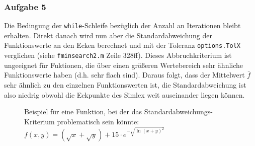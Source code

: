 \documentclass[a4paper, 12pt]{report}
\begin{document}
\subsubsection{Aufgabe 5}
Die Bedingung der \lstinline[basicstyle=\ttfamily\color{black}]|while|-Schleife bezüglich der Anzahl an Iterationen bleibt
erhalten. Direkt danach wird nun aber die Standardabweichung der Funktionswerte an den Ecken berechnet und mit der Toleranz
\lstinline[basicstyle=\ttfamily\color{black}]|options.TolX| verglichen (siehe
\lstinline[basicstyle=\ttfamily\color{black}]|fminsearch2.m| Zeile 328ff). Dieses Abbruchkriterium ist ungeeignet für Fuktionen,
die über einen größeren Wertebereich sehr ähnliche Funktionswerte haben (d.h. sehr flach sind). Daraus folgt, dass der Mittelwert
$\bar f$ sehr ähnlich zu den einzelnen Funktionswerten ist, die Standardabweichung ist also niedrig obwohl die Eckpunkte des Simlex
weit auseinander liegen können.
\begin{figure}[H]
  \centering
  \caption{Beispiel für eine Funktion, bei der das Standardabweichungs-Kriterium problematisch sein könnte: $f(x,y) = (\sqrt{x} + \sqrt{y}) + 15\cdot e^{-\sqrt{\ln(x+y)^2}}$}
\end{figure}
\end{document}

